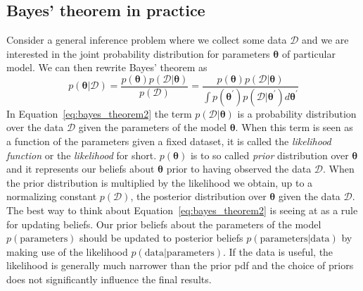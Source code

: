 \documentclass[12pt,dvipsnames]{report}
\renewcommand{\vec}[1]{\boldsymbol{\mathbf{#1}}}
\begin{document}
\subsection{Bayes' theorem in practice}
\label{ssec:likelihood_function}
Consider a general inference problem where we collect some data $\mathcal{D}$ and we are interested
in the joint probability distribution for parameters $\boldsymbol\theta$ of particular model.
We can then rewrite Bayes' theorem as
\begin{equation}
    p(\vec{\theta} | \mathcal{D})=\frac{p(\vec{\theta}) p(\mathcal{D} | \vec{\theta})}{p(\mathcal{D})}=\frac{p(\vec{\theta}) p(\mathcal{D} | \vec{\theta})}{\int p\left(\vec{\theta}^{\prime}\right) p\left(\mathcal{D} |\vec{\theta}^{\prime}\right) d \vec{\theta}^{\prime}}
    \label{eq:bayes_theorem2}
\end{equation}
In Equation~\ref{eq:bayes_theorem2} the term $p(\mathcal{D}|\vec{\theta})$  is a probability
distribution over the data $\mathcal{D}$ given the parameters of the model $\vec{\theta}$.
When this term is seen as a function of the parameters given a fixed dataset, it is
called the \emph{likelihood function }  or the \emph{likelihood} for short. $p(\boldsymbol\theta)$
is to so called \emph{prior} distribution over $\vec{\theta}$ and it represents our beliefs
about $\vec{\theta}$ prior to having observed the data $\mathcal{D}$. When the prior distribution is
multiplied by the likelihood we obtain, up to a normalizing constant $p(\mathcal{D})$, the posterior
distribution over $\vec{\theta}$ given the data $\mathcal{D}$.
The best way to think about Equation~\ref{eq:bayes_theorem2} is seeing at as a rule
for updating beliefs. Our prior beliefs about the parameters of the model
$p(\mathrm{parameters})$ should be updated to posterior beliefs $
    p(\mathrm{parameters} | \mathrm{data})$ by making use of the likelihood
$p(\mathrm{data} | \mathrm{parameters})$. If the data is useful, the likelihood is generally
much narrower than the prior pdf and the choice of priors does not significantly
influence the final results.
\end{document}
